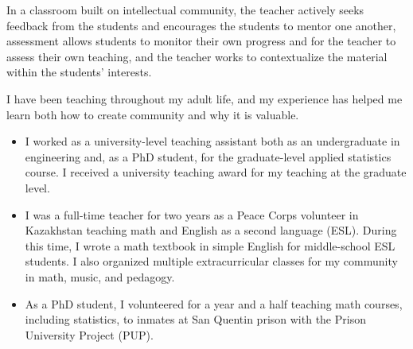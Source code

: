 
In a classroom built on intellectual community, the teacher actively
seeks feedback from the students and encourages the students to mentor one
another, assessment allows students to monitor their own progress and for the
teacher to assess their own teaching, and the teacher works to contextualize the
material within the students' interests.

I have been teaching throughout my adult life, and my experience has helped me
learn both how to create community and why it is valuable.
%
\begin{itemize}
    \item I worked as a university-level teaching assistant both as an
    undergraduate in engineering and, as a PhD student, for the
    graduate-level applied statistics course. I received a university teaching
    award for my teaching at the graduate level.
%
    \item I was a full-time teacher for two years as a Peace Corps volunteer in
    Kazakhstan teaching math and English as a second language (ESL).  During
    this time, I wrote a math textbook in simple English for middle-school ESL
    students.  I also organized multiple extracurricular classes for my
    community in math, music, and pedagogy.
%
    \item As a PhD student, I volunteered for a year and a half teaching math
    courses, including statistics, to inmates at San Quentin prison with the
    Prison University Project (PUP).
%
\end{itemize}

